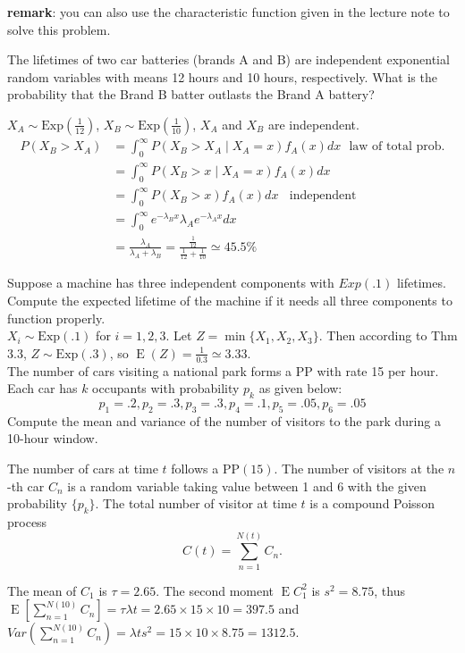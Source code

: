 \documentclass[  11pt]{article}
\newcommand{\PP}{\mbox{PP}}
\newcommand{\Exp}{\mbox{Exp}}
\newcommand{\e}{ \operatorname{E}}
\newcommand{\la}{\lambda}
\begin{document}
\begin{ExerciseList}
\textbf{remark}: you can also use the characteristic function given in the lecture note to solve this problem.


\Exercise [origin={3.2, p80}] 
  The lifetimes of two car batteries (brands A and B) are independent exponential random variables with means 12 hours and 10 hours, respectively. What is the probability that the Brand B batter outlasts the Brand A battery?
  
\Answer
$X_A \sim \Exp(\frac{1}{12})$, $X_B \sim \Exp(\frac{1}{10})$, $X_A$ and $X_B$ are independent.
\[\begin{split}
P(X_B > X_A) & = \int_{0}^{\infty} P(X_B > X_A \mid X_A = x) f_A(x) dx  ~~~\mbox{law of total prob.} \\
& = \int_{0}^{\infty} P(X_B > x \mid X_A =x) f_A(x) dx \\
& = \int_{0}^{\infty} P(X_B > x) f_A(x) dx ~~~~\mbox{independent}\\
& = \int_{0}^{\infty} e^{-\lambda_B x} \lambda_A e^{-\lambda_A x} dx\\
& = \frac{\lambda_A}{\lambda_A + \lambda_B} = \frac{\frac{1}{12}}{\frac{1}{12}+\frac{1}{10}} \simeq 45.5\%
\end{split} \]

\Exercise [origin={3.3, p80}] 
Suppose a machine has three independent components with $Exp(.1)$ lifetimes. Compute the expected lifetime of the machine if it needs all three components to function properly.\\

\Answer
$X_i \sim \Exp(.1)$ for $i=1,2,3$.
Let $Z = \min \{X_1,X_2,X_3\}$. Then according to Thm 3.3, $Z \sim \Exp(.3)$, so $\e(Z) = \frac{1}{0.3} \simeq 3.33$.\\
 
\Exercise [origin={3.29, p83}] 
  The number of cars visiting a national park forms a $\PP$ with rate 15 per hour. Each car has $k$ occupants with probability $p_k$ as given below:
$$p_1 = .2, p_2 = .3, p_3 = .3, p_4 = .1, p_5 = .05, p_6 = .05$$
Compute the mean and variance of the number of visitors to the park during a 10-hour window.

\Answer
The number of cars at time $t$ follows a $\PP(15)$.
The number of visitors at the $n$-th car $C_n$ is a random variable taking value between 1 and 6
with the given probability $\{p_k\}$. The total number of visitor at time $t$ is a compound Poisson process
\[C(t)=\sum_{n=1}^{N(t)} C_n.\]

The mean of $C_1$ is $\tau = 2.65$.
The second moment $\e C_1^2$ is $s^2 = 8.75$, thus $\e[\sum_{n=1}^{N(10)} C_n] = \tau \la t = 2.65\times 15\times 10 = 397.5$ and $Var(\sum_{n=1}^{N(10)} C_n) = \la t s^2 = 15\times 10\times 8.75 = 1312.5$.


\end{ExerciseList}
\end{document}
